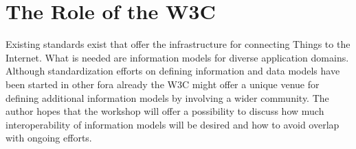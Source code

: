 \documentclass[journal]{IEEEtran}
\begin{document}
\section{The Role of the W3C}
Existing standards exist that offer the infrastructure for connecting Things to the Internet. What is needed are information models for diverse application domains. Although standardization efforts on defining information and data models have been started in other fora already the W3C might offer a unique venue for defining additional information models by involving a wider community. The author hopes that the workshop will offer a possibility to discuss how much interoperability of information models will be desired and how to avoid overlap with ongoing efforts. 



\end{document}
